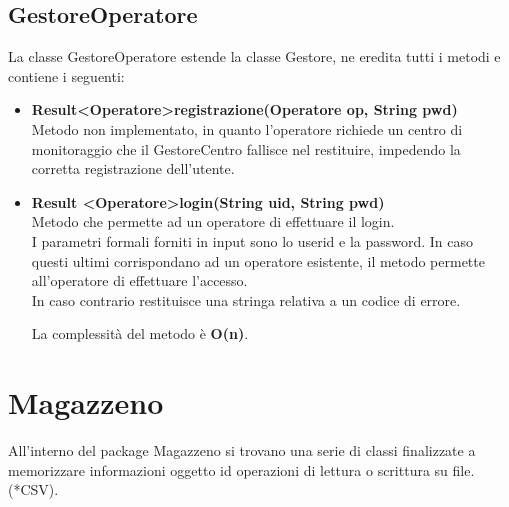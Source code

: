 \documentclass[a4paper, 12pt]{scrreprt}
\begin{document}
			\subsection{GestoreOperatore}
			La classe GestoreOperatore estende la classe Gestore, ne eredita tutti i metodi e contiene i seguenti:
			\begin{itemize}
				\item \textbf{Result\textless Operatore\textgreater registrazione(Operatore op, String pwd)}
				\\Metodo non implementato, in quanto l'operatore richiede un centro di monitoraggio che il GestoreCentro fallisce nel restituire, impedendo la corretta registrazione  dell'utente.
				
				\item \textbf{Result \textless Operatore\textgreater login(String uid, String pwd)}
				\\Metodo che permette ad un operatore di effettuare il login.
				\\I parametri formali forniti in input sono lo userid e la password. In caso questi ultimi corrispondano ad un operatore esistente, il metodo permette all'operatore di effettuare l'accesso.
				\\In caso contrario restituisce una stringa relativa a un codice di errore.
				
				La complessit\`a del metodo \`e \textbf{O(n)}.
			\end{itemize}


		\section{Magazzeno}
		All'interno del package Magazzeno si trovano una serie di classi finalizzate a memorizzare informazioni oggetto id operazioni di lettura o scrittura su file.(*CSV).
\end{document}
